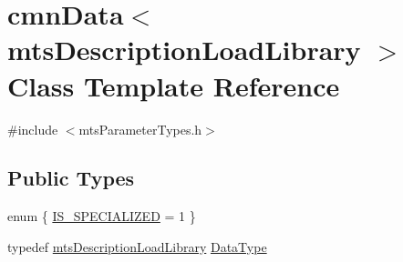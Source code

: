 \hypertarget{classcmn_data_3_01mts_description_load_library_01_4}{}\section{cmn\+Data$<$ mts\+Description\+Load\+Library $>$ Class Template Reference}
\label{classcmn_data_3_01mts_description_load_library_01_4}


{\ttfamily \#include $<$mts\+Parameter\+Types.\+h$>$}

\subsection*{Public Types}
\begin{DoxyCompactItemize}
\item 
enum \{ \hyperlink{classcmn_data_3_01mts_description_load_library_01_4_a78f5329545bd217f5017664b6e63a491acfe38b1285f5f20f7d6c9bbf8fa376fe}{I\+S\+\_\+\+S\+P\+E\+C\+I\+A\+L\+I\+Z\+E\+D} = 1
 \}
\item 
typedef \hyperlink{classmts_description_load_library}{mts\+Description\+Load\+Library} \hyperlink{classcmn_data_3_01mts_description_load_library_01_4_a185937b284886b8335946dd8e0591d0a}{Data\+Type}
\end{DoxyCompactItemize}
